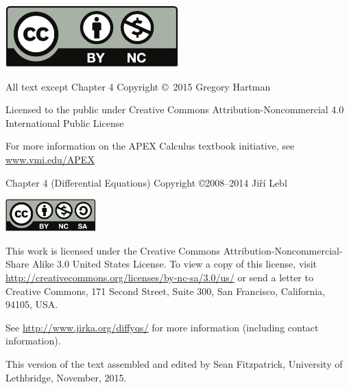 \noindent\hskip -1in\begin{minipage}{2in}
\includegraphics{text/by-nc} 
\end{minipage}
\begin{minipage}{3in}
\noindent All text except Chapter 4 Copyright \copyright\ 2015 Gregory Hartman

Licensed to the public under Creative Commons Attribution-Noncommercial 4.0 International Public License

\bigskip

For more information on the APEX Calculus textbook initiative, see \href{http://www.vmi.edu/APEX}{www.vmi.edu/APEX}
\end{minipage}

Chapter 4 (Differential Equations) Copyright \copyright 2008--2014 Ji{\v r}\'i Lebl

\bigskip

\noindent
\includegraphics[width=1.38in]{figures/license}

\bigskip

\noindent
This work is licensed under the Creative Commons
Attribution-Non\-commercial-Share Alike 3.0 United States License. To view a
copy of this license, visit
\url{http://creativecommons.org/licenses/by-nc-sa/3.0/us/} or send a letter to
Creative Commons, 171 Second Street, Suite 300, San Francisco, California,
94105, USA.

\bigskip


\noindent
See \href{http://www.jirka.org/diffyqs/}{http://www.jirka.org/diffyqs/} for more information
(including contact information).

\bigskip

\bigskip

This version of the text assembled and edited by Sean Fitzpatrick, University of Lethbridge, November, 2015. 

